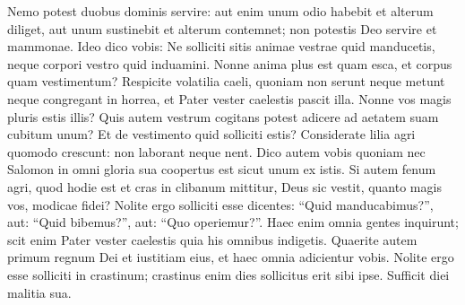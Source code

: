 \begin{biblechapter}
\verse Nemo potest duobus dominis servire: aut enim unum odio habebit et alterum diliget, aut unum sustinebit et alterum contemnet; non potestis Deo servire et mammonae. 
\verse Ideo dico vobis: Ne solliciti sitis animae vestrae quid manducetis, neque corpori vestro quid induamini. Nonne anima plus est quam esca, et corpus quam vestimentum? 
\verse Respicite volatilia caeli, quoniam non serunt neque metunt neque congregant in horrea, et Pater vester caelestis pascit illa. Nonne vos magis pluris estis illis? 
\verse Quis autem vestrum cogitans potest adicere ad aetatem suam cubitum unum? 
\verse Et de vestimento quid solliciti estis? Considerate lilia agri quomodo crescunt: non laborant neque nent. 
\verse Dico autem vobis quoniam nec Salomon in omni gloria sua coopertus est sicut unum ex istis. 
\verse Si autem fenum agri, quod hodie est et cras in clibanum mittitur, Deus sic vestit, quanto magis vos, modicae fidei? 
\verse Nolite ergo solliciti esse dicentes: “Quid manducabimus?”, aut: “Quid bibemus?”, aut: “Quo operiemur?”. 
\verse Haec enim omnia gentes inquirunt; scit enim Pater vester caelestis quia his omnibus indigetis. 
\verse Quaerite autem primum regnum Dei et iustitiam eius, et haec omnia adicientur vobis. 
\verse Nolite ergo esse solliciti in crastinum; crastinus enim dies sollicitus erit sibi ipse. Sufficit diei malitia sua. 
\end{biblechapter}

